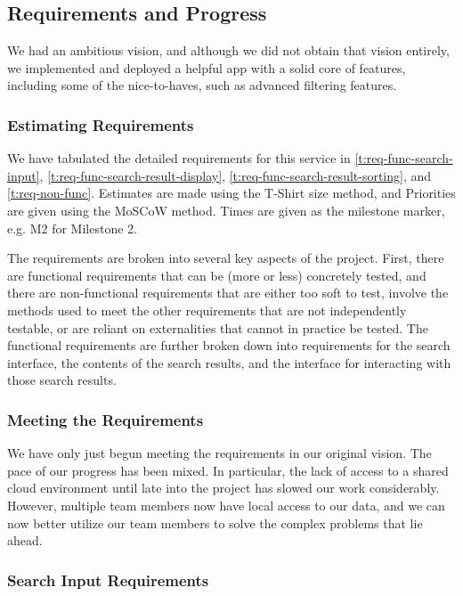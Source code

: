 \subsection{Requirements and Progress}

We had an ambitious vision, and although we did not obtain that vision entirely, we implemented and deployed a helpful app with a solid core of features, including some of the nice-to-haves, such as advanced filtering features. 

\subsubsection{Estimating Requirements}

We have tabulated the detailed requirements for this service in \autoref{t:req-func-search-input}, \autoref{t:req-func-search-result-display}, \autoref{t:req-func-search-result-sorting}, and \autoref{t:req-non-func}. Estimates are made using the T-Shirt size method, and Priorities are given using the MoSCoW method. Times are given as the milestone marker, e.g. M2 for Milestone 2.

The requirements are broken into several key aspects of the project. First, there are functional requirements that can be (more or less) concretely tested, and there are non-functional requirements that are either too soft to test, involve the methods used to meet the other requirements that are not independently testable, or are reliant on externalities that cannot in practice be tested. The functional requirements are further broken down into requirements for the search interface, the contents of the search results, and the interface for interacting with those search results. 

\subsubsection{Meeting the Requirements}

We have only just begun meeting the requirements in our original vision. The pace of our progress has been mixed. In particular, the lack of access to a shared cloud environment until late into the project has slowed our work considerably. However, multiple team members now have local access to our data, and we can now better utilize our team members to solve the complex problems that lie ahead. 

\def\requirementwidth{11.3cm}
\def\matrixwidth{1.3cm}

\subsubsection{Search Input Requirements}

